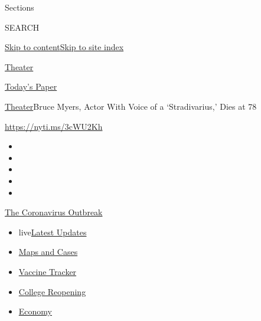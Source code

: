 Sections

SEARCH

\protect\hyperlink{site-content}{Skip to
content}\protect\hyperlink{site-index}{Skip to site index}

\href{https://www.nytimes3xbfgragh.onion/section/theater}{Theater}

\href{https://myaccount.nytimes3xbfgragh.onion/auth/login?response_type=cookie\&client_id=vi}{}

\href{https://www.nytimes3xbfgragh.onion/section/todayspaper}{Today's
Paper}

\href{/section/theater}{Theater}\textbar{}Bruce Myers, Actor With Voice
of a `Stradivarius,' Dies at 78

\url{https://nyti.ms/3cWU2Kh}

\begin{itemize}
\item
\item
\item
\item
\item
\end{itemize}

\href{https://www.nytimes3xbfgragh.onion/news-event/coronavirus?action=click\&pgtype=Article\&state=default\&region=TOP_BANNER\&context=storylines_menu}{The
Coronavirus Outbreak}

\begin{itemize}
\tightlist
\item
  live\href{https://www.nytimes3xbfgragh.onion/2020/08/03/world/coronavirus-covid-19.html?action=click\&pgtype=Article\&state=default\&region=TOP_BANNER\&context=storylines_menu}{Latest
  Updates}
\item
  \href{https://www.nytimes3xbfgragh.onion/interactive/2020/us/coronavirus-us-cases.html?action=click\&pgtype=Article\&state=default\&region=TOP_BANNER\&context=storylines_menu}{Maps
  and Cases}
\item
  \href{https://www.nytimes3xbfgragh.onion/interactive/2020/science/coronavirus-vaccine-tracker.html?action=click\&pgtype=Article\&state=default\&region=TOP_BANNER\&context=storylines_menu}{Vaccine
  Tracker}
\item
  \href{https://www.nytimes3xbfgragh.onion/2020/08/02/us/covid-college-reopening.html?action=click\&pgtype=Article\&state=default\&region=TOP_BANNER\&context=storylines_menu}{College
  Reopening}
\item
  \href{https://www.nytimes3xbfgragh.onion/live/2020/08/03/business/stock-market-today-coronavirus?action=click\&pgtype=Article\&state=default\&region=TOP_BANNER\&context=storylines_menu}{Economy}
\end{itemize}

